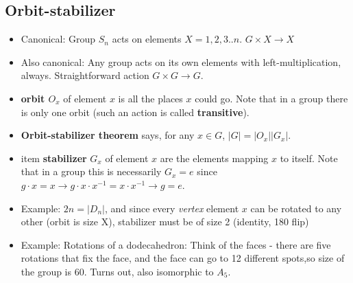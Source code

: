 \documentclass[11pt, oneside]{article}   	%
\begin{document}
\subsection{Orbit-stabilizer}
\begin{itemize}
\item Canonical: Group $S_n$ acts on elements $X = {1, 2, 3 .. n}$.  $G \times X \rightarrow X$
\item Also canonical: Any group acts on its own elements with left-multiplication, always.  Straightforward action $G \times G \rightarrow G$.
\item \textbf{orbit $O_x$} of element $x$ is all the places $x$ could go.  Note that in a group there is only one orbit (such an action is called \textbf{transitive}).
\item \textbf{Orbit-stabilizer theorem} says, for any $x \in G$, $|G| = |O_x| |G_x|$.
\item item \textbf{stabilizer} $G_x$ of element $x$ are the elements mapping $x$ to itself.  Note that in a group this is necessarily $G_x = {e}$ since $g \cdot x = x \rightarrow g \cdot x \cdot x^{-1} = x \cdot x^{-1} \rightarrow g = e$.
\item Example: $2n = |D_n|$, and since every \emph{vertex} element $x$ can be rotated to any other (orbit is size X), stabilizer must be of size 2 (identity, 180 flip)
\item Example: Rotations of a dodecahedron: Think of the faces - there are five rotations that fix the face, and the face can go to 12 different spots,so size of the group is 60. Turns out, also isomorphic to $A_5$.
\end{itemize}
\end{document}
